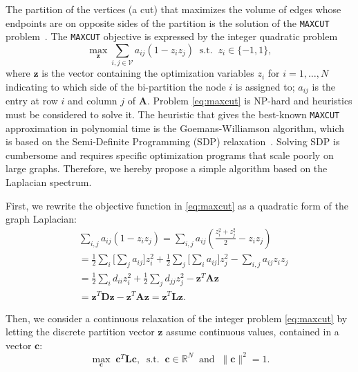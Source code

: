 \documentclass[journal]{IEEEtran}
\def\z{{\mathbf z}}
\def\c{{\mathbf c}}
\def\A{{\mathbf A}}
\def\L{{\mathbf L}}
\def\D{{\mathbf D}}
\newcommand{\maxcut}{\texttt{\small{MAXCUT}}}
\begin{document}
The partition of the vertices (a cut) that maximizes the volume of edges whose endpoints are on opposite sides of the partition is the solution of the \maxcut{} problem~\cite{palagi2012computational}.
The \maxcut{} objective is expressed by the integer quadratic problem
\begin{equation}
    \label{eq:maxcut}
    \max \limits_{\z} \sum \limits_{i,j \in  \mathcal{V}} a_{ij}(1- z_i z_j) \;\; \text{s.t.} \;\; z_i \in \{ -1, 1 \},
\end{equation}
where $\z$ is the vector containing the optimization variables $z_i$ for $i=1, \dots, N$ indicating to which side of the bi-partition the node $i$ is assigned to; $a_{ij}$ is the entry at row $i$ and column $j$ of $\A$.
Problem \eqref{eq:maxcut} is NP-hard and heuristics must be considered to solve it.
The heuristic that gives the best-known \maxcut{} approximation in polynomial time is the Goemans-Williamson algorithm, which is based on the Semi-Definite Programming (SDP) relaxation~\cite{goemans1995improved}.
Solving SDP is cumbersome and requires specific optimization programs that scale poorly on large graphs.
Therefore, we hereby propose a simple algorithm based on the Laplacian spectrum.

First, we rewrite the objective function in \eqref{eq:maxcut} as a quadratic form of the graph Laplacian:
\begin{equation*}
    \begin{aligned}
    & \sum \limits_{i,j} a_{ij}(1- z_i z_j) = \sum \limits_{i,j} a_{ij} \left(\frac{z_i^2 + z_j^2}{2} - z_i z_j \right) \\
    & = \frac{1}{2} \sum \limits_i \Bigg[ \sum \limits_j a_{ij} \Bigg]z_i^2 + \frac{1}{2} \sum \limits_j \Bigg[ \sum \limits_i a_{ij} \Bigg] z_j^2 - \sum \limits_{i,j} a_{ij} z_i z_j \\
    & = \frac{1}{2} \sum \limits_i d_{ii} z_i^2 + \frac{1}{2} \sum \limits_j d_{jj} z_j^2 - \z^T \A \z \\
    & = \z^T \D \z - \z^T \A \z = \z^T \L \z.
    \end{aligned}
\end{equation*}

Then, we consider a continuous relaxation of the integer problem \eqref{eq:maxcut} by letting the discrete partition vector $\z$ assume continuous values, contained in a vector $\c$:
\begin{equation}
    \label{eq:relaxed}
    \max \limits_{\c} \; \c^T \L \c, \;\; \text{s.t.} \;\; \c \in \mathbb{R}^N \;\; \text{and} \;\; \| \c \|^2 = 1.
\end{equation}
\end{document}
